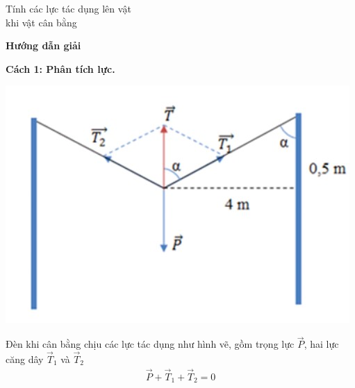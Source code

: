 \begin{dang}{Tính các lực tác dụng lên vật \\khi vật cân bằng}
{	}
	{	\begin{center}
			\textbf{Hướng dẫn giải}
		\end{center}
		\textbf{Cách 1: Phân tích lực.}
		\begin{center}
			\includegraphics[scale=0.5]{../figs/VN10-PH-11-L-008-4-V2-04.jpg}
		\end{center}
		Đèn khi cân bằng chịu các lực tác dụng như hình vẽ, gồm trọng lực $\vec{P}$, hai lực căng dây $\vec{T}_1$ và $\vec{T}_2$
		\begin{align*}
			\vec{P}+\vec{T}_1+\vec{T}_2=0
		\end{align*}
		
}
\end{dang}
